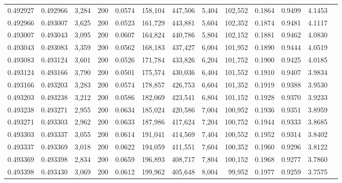 \begin{tabular}{rrrrrrrrrrrrr}
0.492927 & 0.492966 &  3,284 & 200 &                                     0.0574 & 158,104 & 447,506 &   5,404 & 102,552 & 0.1864 & 0.9499 & 4.1453 \\
0.492966 & 0.493007 &  3,625 & 200 &                                     0.0523 & 161,729 & 443,881 &   5,604 & 102,352 & 0.1874 & 0.9481 & 4.1117 \\
0.493007 & 0.493043 &  3,095 & 200 &                                     0.0607 & 164,824 & 440,786 &   5,804 & 102,152 & 0.1881 & 0.9462 & 4.0830 \\
0.493043 & 0.493083 &  3,359 & 200 &                                     0.0562 & 168,183 & 437,427 &   6,004 & 101,952 & 0.1890 & 0.9444 & 4.0519 \\
0.493083 & 0.493124 &  3,601 & 200 &                                     0.0526 & 171,784 & 433,826 &   6,204 & 101,752 & 0.1900 & 0.9425 & 4.0185 \\
0.493124 & 0.493166 &  3,790 & 200 &                                     0.0501 & 175,574 & 430,036 &   6,404 & 101,552 & 0.1910 & 0.9407 & 3.9834 \\
0.493166 & 0.493203 &  3,283 & 200 &                                     0.0574 & 178,857 & 426,753 &   6,604 & 101,352 & 0.1919 & 0.9388 & 3.9530 \\
0.493203 & 0.493238 &  3,212 & 200 &                                     0.0586 & 182,069 & 423,541 &   6,804 & 101,152 & 0.1928 & 0.9370 & 3.9233 \\
0.493238 & 0.493271 &  2,955 & 200 &                                     0.0634 & 185,024 & 420,586 &   7,004 & 100,952 & 0.1936 & 0.9351 & 3.8959 \\
0.493271 & 0.493303 &  2,962 & 200 &                                     0.0633 & 187,986 & 417,624 &   7,204 & 100,752 & 0.1944 & 0.9333 & 3.8685 \\
0.493303 & 0.493337 &  3,055 & 200 &                                     0.0614 & 191,041 & 414,569 &   7,404 & 100,552 & 0.1952 & 0.9314 & 3.8402 \\
0.493337 & 0.493369 &  3,018 & 200 &                                     0.0622 & 194,059 & 411,551 &   7,604 & 100,352 & 0.1960 & 0.9296 & 3.8122 \\
0.493369 & 0.493398 &  2,834 & 200 &                                     0.0659 & 196,893 & 408,717 &   7,804 & 100,152 & 0.1968 & 0.9277 & 3.7860 \\
0.493398 & 0.493430 &  3,069 & 200 &                                     0.0612 & 199,962 & 405,648 &   8,004 &  99,952 & 0.1977 & 0.9259 & 3.7575 \\

\end{tabular}
